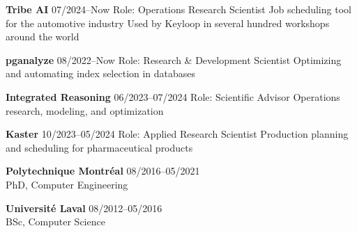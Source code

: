 \documentclass{memoir}
\begin{document}
\par
\vspace{1.5\baselineskip}
\begin{list}{}{
    \setlength\leftmargin{1.2in}
    \setlength\rightmargin{0in}
    \setlength{}
    \setlength{}
    \setlength\listparindent{0in}
    \setlength\itemindent{0in}
    \setlength\parskip{0in}
    \setlength\topsep{0in}
    \setlength\parsep{0in}
    \setlength\itemsep{0.90\baselineskip}
    \setlength\partopsep{0in}}

  


  \Item \textbf{Tribe AI} \hfill 07/2024--Now
  \BulletItem Role: Operations Research Scientist
  \BulletItem Job scheduling tool for the automotive industry
  \BulletItem Used by Keyloop in several hundred workshops around the world

  \Item \textbf{pganalyze} \hfill 08/2022--Now
  \BulletItem Role: Research \& Development Scientist
  \BulletItem Optimizing and automating index selection in databases
  
  \Item \textbf{Integrated Reasoning} \hfill 06/2023--07/2024
  \BulletItem Role: Scientific Advisor
  \BulletItem Operations research, modeling, and optimization

  \Item \textbf{Kaster} \hfill 10/2023--05/2024
  \BulletItem Role: Applied Research Scientist
  \BulletItem Production planning and scheduling for pharmaceutical products




  

  \Item \textbf{Polytechnique Montréal} \hfill 08/2016--05/2021 \\
  PhD, Computer Engineering

  \Item \textbf{Université Laval} \hfill 08/2012--05/2016 \\
  BSc, Computer Science

  

\end{list}
\end{document}

